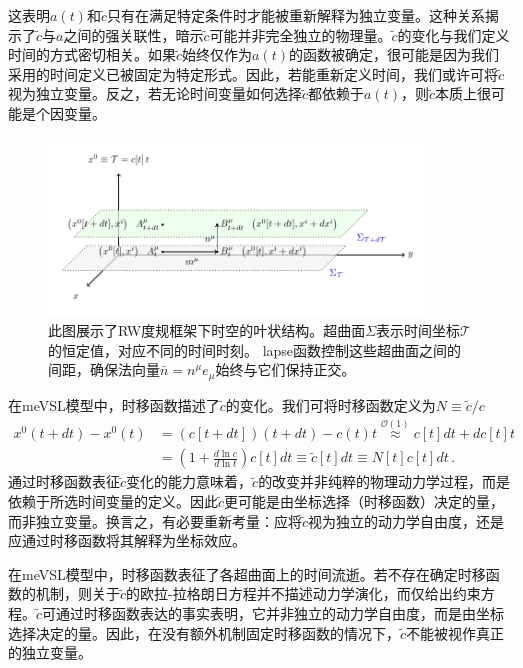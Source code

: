 \documentclass[jkps,preprint,fleqn]{revtex4}
\newcommand{\tc}{\tilde{c}}
\begin{document}
这表明$a(t)$和$\tc$只有在满足特定条件时才能被重新解释为独立变量。这种关系揭示了$\tc$与$a$之间的强关联性，暗示$\tc$可能并非完全独立的物理量。$\tc$的变化与我们定义时间的方式密切相关。如果$\tc$始终仅作为$a(t)$的函数被确定，很可能是因为我们采用的时间定义已被固定为特定形式。因此，若能重新定义时间，我们或许可将$\tc$视为独立变量。反之，若无论时间变量如何选择$\tc$都依赖于$a(t)$，则$\tc$本质上很可能是个因变量。

\begin{figure}
	\begin{center}
	\includegraphics[width=0.9\textwidth]{Fig2.pdf}
	\caption{此图展示了RW度规框架下时空的叶状结构。超曲面$\Sigma$表示时间坐标$\mathcal{T}$的恒定值，对应不同的时间时刻。 lapse函数控制这些超曲面之间的间距，确保法向量$\bar{n} = n^{\mu} e_{\mu}$始终与它们保持正交。}
	\label{Fig2}
	\end{center}
\end{figure}

在meVSL模型中，时移函数描述了$\tc$的变化。我们可将时移函数定义为$N \equiv \tc/c$
\begin{align}
x^{0}(t+dt) - x^{0}(t) &=  \left( c[t+dt] \right) \left( t+dt \right) - c(t) t \overset{\mathcal{O}(1)}{\approx} c[t] dt + dc[t] t \nonumber \\
	&= \left( 1 + \frac{d \ln c}{d \ln t} \right) c[t] dt \equiv \tilde{c}[t] dt \equiv N[t] c[t] dt \label{NmeVSL} \,.
\end{align}
通过时移函数表征$\tc$变化的能力意味着，$\tc$的改变并非纯粹的物理动力学过程，而是依赖于所选时间变量的定义。因此$\tc$更可能是由坐标选择（时移函数）决定的量，而非独立变量。换言之，有必要重新考量：应将$\tc$视为独立的动力学自由度，还是应通过时移函数将其解释为坐标效应。

在meVSL模型中，时移函数表征了各超曲面上的时间流逝。若不存在确定时移函数的机制，则关于$\tc$的欧拉-拉格朗日方程并不描述动力学演化，而仅给出约束方程。$\tc$可通过时移函数表达的事实表明，它并非独立的动力学自由度，而是由坐标选择决定的量。因此，在没有额外机制固定时移函数的情况下，$\tc$不能被视作真正的独立变量。
\end{document}

